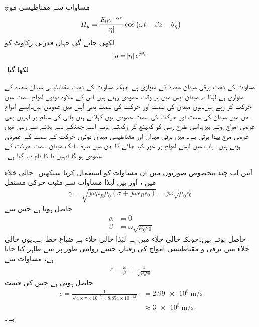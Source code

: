 مساوات  سے مقناطیسی موج
\begin{align}\label{مساوات_موج_عمومی_مقناطیسی}
H_y=\frac{E_0 e^{-\alpha z}}{\abs{\eta}} \cos \left(\omega t - \beta z -\theta_{\eta} \right)
\end{align}
لکھی جائے گی جہاں قدرتی رکاوٹ کو
\begin{align}
\eta=\abs{\eta} e^{j \theta_{\eta}}
\end{align}
لکھا گیا۔

مساوات  کے تحت برقی میدان  محدد کے متوازی ہے جبکہ مساوات  کے تحت مقناطیسی میدان  محدد کے متوازی ہے لہٰذا یہ میدان  آپس میں ہر وقت عمودی رہتے ہیں۔اس کے علاوہ دونوں امواج  سمت میں حرکت کر رہے ہیں۔یوں میدان کی سمت اور حرکت کی سمت بھی آپس میں عمودی ہیں۔ایسے امواج جن میں میدان کی سمت اور حرکت کی سمت عمودی ہوں  کہلاتے ہیں۔پانی کی سطح پر لہریں بھی عرضی امواج ہوتے ہیں۔اسی طرح رسی کو کھینچ کر رکھتے ہوئے اسے جھٹکے  سے ہلانے سے  رسی میں عرضی موج پیدا ہوتی ہے۔ میں برقی میدان اور مقناطیسی میدان دونوں حرکت کے سمت کے عمودی ہوتے ہیں۔ باب  میں ایسے امواج پر غور کیا جائے گا جن میں صرف ایک میدان سمت حرکت کے عمودی ہو گا۔انہیں  یا  کا نام دیا گیا ہے۔ 

آئیں اب چند مخصوص صورتوں میں ان مساوات کو استعمال کرنا سیکھیں۔
خالی خلاء میں ،  اور   ہیں لہٰذا مساوات  سے مثبت حرکی مستقل
\begin{align*}
\gamma=\sqrt{j \omega \mu_R \mu_0  \left(\sigma +j \omega \epsilon_R \epsilon_0 \right)}=j \omega \sqrt{\mu_0 \epsilon_0}
\end{align*}
حاصل ہوتا ہے جس سے
\begin{align*}
\alpha&=0\\
\beta&=\omega \sqrt{\mu_0 \epsilon_0}
\end{align*}
حاصل ہوتے ہیں۔چونکہ خالی خلاء میں   ہے لہٰذا خالی خلاء بے ضیاع خطہ ہے۔یوں خالی خلاء میں برقی و مقناطیسی امواج کی رفتار، جسے روایتی طور پر  سے ظاہر کیا جاتا ہے،  مساوات  سے
\begin{align}
c=\frac{\omega}{\beta}=\frac{1}{\sqrt{\mu_0 \epsilon_0}}
\end{align}
حاصل ہوتی ہے جس کی قیمت
\begin{align*}
c=\frac{1}{\sqrt{4 \times \pi \times 10^{-7} \times 8.854 \times 10^{-12}}}&=\SI{2.99e8}{\meter \per \second} \\
&\approx \SI{3e8}{\meter \per \second}
\end{align*}
ہے۔

